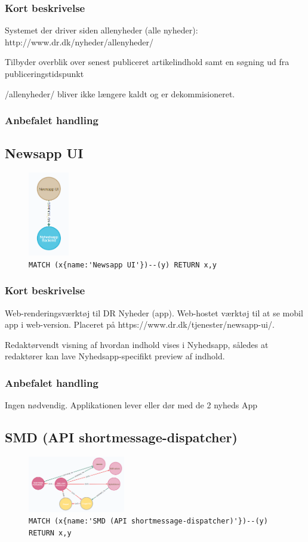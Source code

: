 \documentclass{article}
\begin{document}
\subsubsection*{Kort beskrivelse}
Systemet der driver siden allenyheder (alle nyheder): http://www.dr.dk/nyheder/allenyheder/	

Tilbyder overblik over senest publiceret artikelindhold samt en søgning ud fra publiceringstidspunkt

/allenyheder/ bliver ikke længere kaldt og er dekommisioneret.
\subsubsection*{Anbefalet handling}



\subsection{Newsapp UI}
\begin{figure}[H]
\includegraphics[width=50pt]{NyhedsAppUi.PNG}
\cprotect\caption{\verb|MATCH (x{name:'Newsapp UI'})--(y) RETURN x,y|}
\end{figure}
\subsubsection*{Kort beskrivelse}
Web-renderingsværktøj til DR Nyheder (app). Web-hostet værktøj til at se mobil app i web-version. Placeret på https://www.dr.dk/tjenester/newsapp-ui/.	

Redaktørvendt visning af hvordan indhold vises i Nyhedsapp, således at redaktører kan lave Nyhedsapp-specifikt preview af indhold.
\subsubsection*{Anbefalet handling}
Ingen nødvendig. Applikationen lever eller dør med de 2 nyheds App


\subsection{SMD (API shortmessage-dispatcher)}
\begin{figure}[H]
\includegraphics[width=120pt]{SMD.PNG}
\cprotect\caption{\verb|MATCH (x{name:'SMD (API shortmessage-dispatcher)'})--(y) RETURN x,y|}
\end{figure}
\end{document}

